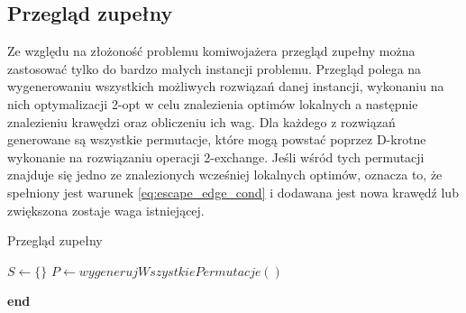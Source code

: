 \newpage

\subsection{Przegląd zupełny}
Ze względu na złożoność problemu komiwojażera przegląd zupełny można zastosować tylko do bardzo małych instancji problemu.
Przegląd polega na wygenerowaniu wszystkich możliwych rozwiązań danej instancji, wykonaniu na nich optymalizacji 2-opt w celu znalezienia
optimów lokalnych a następnie znalezieniu krawędzi oraz obliczeniu ich wag. Dla każdego z rozwiązań generowane są wszystkie
permutacje, które mogą powstać poprzez D-krotne wykonanie na rozwiązaniu operacji 2-exchange. Jeśli wśród tych permutacji znajduje się jedno ze znalezionych wcześniej
lokalnych optimów, oznacza to, że spełniony jest warunek \ref{eq:escape_edge_cond} i dodawana jest nowa krawędź lub zwiększona zostaje waga istniejącej.

\begin{algorithm}[]
    \caption{Przegląd zupełny}\label{alg:exhaustive}
    $S \gets \{\}$\;
    $P \gets wygenerujWszystkiePermutacje()$\;




    \vspace{1em}

    \textbf{end}

\end{algorithm}

